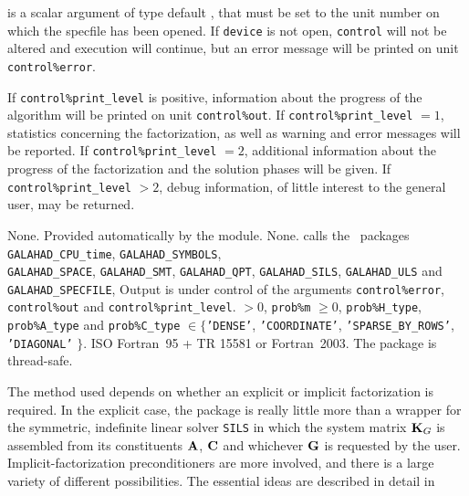 \documentclass{galahad}
\newcommand{\packagename}{SBLS}
\begin{document}
\begin{description}
 is a scalar \intentin argument of type default \integer,
that must be set to the unit number on which the specfile
has been opened. If {\tt device} is not open, {\tt control} will
not be altered and execution will continue, but an error message
will be printed on unit {\tt control\%error}.

\end{description}


\galinfo
If {\tt control\%print\_level} is positive, information about the progress
of the algorithm will be printed on unit {\tt control\-\%out}.
If {\tt control\%print\_level} $= 1$, statistics concerning the factorization,
as well as warning and error messages will be reported.
If {\tt control\%print\_level} $= 2$, additional information about the
progress of the factorization and the solution phases will be given.
If {\tt control\%print\_level} $> 2$, debug information, of little
interest to the general user, may be returned.


\galgeneral

\galcommon None.
\galworkspace Provided automatically by the module.
\galroutines None.
\galmodules {\tt \packagename\_solve} calls the \galahad\ packages
{\tt GALAHAD\_CPU\_time},
{\tt GALAHAD\_SY\-M\-BOLS}, \\
{\tt GALAHAD\-\_SPACE},
{\tt GALAHAD\_SMT},
{\tt GALAHAD\_QPT},
{\tt GALAHAD\_SILS},
{\tt GALAHAD\_ULS} and
{\tt GALAHAD\_SPECFILE},
\galio Output is under control of the arguments
 {\tt control\%error}, {\tt control\%out} and {\tt control\%print\_level}.
 $> 0$, {\tt prob\%m} $\geq  0$,
{\tt prob\%H\_type}, {\tt prob\%A\_type}
and {\tt prob\%C\_type} $\in \{${\tt 'DENSE'},
 {\tt 'COORDINATE'}, {\tt 'SPARSE\_BY\_ROWS'}, {\tt 'DIAGONAL'} $\}$.
\galportability ISO Fortran~95 + TR 15581 or Fortran~2003.
The package is thread-safe.


\galmethod
The method used depends on whether an explicit or implicit
factorization is required. In the explicit case, the
package is really little more than a wrapper for the
symmetric, indefinite linear solver {\tt SILS} in
which the system matrix ${\mathbf{K}}_G$ is assembled from its constituents
${\mathbf{A}}$, ${\mathbf{C}}$ and whichever ${\mathbf{G}}$ is requested by the user.
Implicit-factorization preconditioners are more involved,
and there is a large variety of different possibilities. The
essential ideas are described in detail in
\vspace*{1mm}
\end{document}
